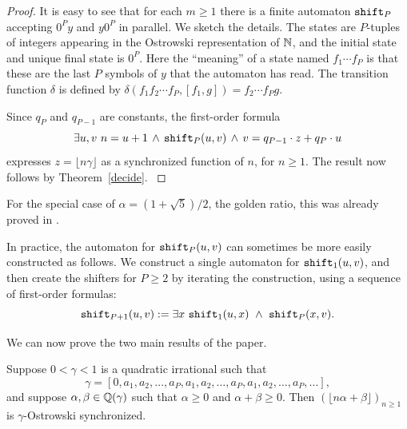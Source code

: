 \documentclass[12pt,reqno]{article}
\begin{document}
\begin{proof}
It is easy to see that for each
$m \geq 1$ there is a finite automaton
${\tt shift}_P$ accepting $0^P y$ and $y 0^P$ in parallel. 
We sketch the details.   The states are $P$-tuples of
integers appearing in the Ostrowski representation of 
$\mathbb{N}$, and the initial state and unique final state is $0^P$.
Here the ``meaning'' of a state named $f_1\cdots f_P$ is
that these are the last $P$ symbols of $y$ that the automaton has read.
The transition function $\delta$ is
defined by $\delta(f_1 f_2 \cdots f_P, [f_1, g]) = f_2 \cdots f_P g$.

Since $q_P$ and $q_{P-1}$ are constants, the 
first-order formula
$$\exists u,v \ n=u+1 \, \wedge \, {\tt shift}_P(u,v) \, \wedge \, v=q_{P-1} \cdot z + q_{P}
\cdot u$$
expresses $z = \lfloor n \gamma \rfloor$ as a synchronized function of $n$, for $n \geq 1$.  The result now follows by Theorem~\ref{decide}.
\label{main2}
\end{proof}

\begin{remark} 
For the special case of $\alpha = (1+\sqrt{5})/2$, the golden ratio, this was
already proved in \cite{Mousavi&Schaeffer&Shallit:2016}.   
\end{remark}

\begin{remark}
In practice, the automaton for ${\tt shift}_P(u,v)$ can sometimes be more
easily constructed as follows.  We construct a single automaton
for ${\tt shift}_1(u,v)$, and then create the shifters for $P \geq 2$
by iterating the construction, using a sequence of first-order formulas:
$$\shift_{P+1}(u,v) := \exists x \ \shift_1(u,x) \AND \shift_P(x,v).$$
\end{remark}

We can now prove the two main results of the paper.

\begin{theorem}
Suppose $0 < \gamma < 1$ is a quadratic irrational
such that 
$$\gamma = [0, a_1, a_2, \ldots, a_P, a_1, a_2, \ldots, a_P, a_1, a_2, \ldots, a_P,
\ldots],$$
and suppose $\alpha, \beta \in \mathbb{Q}(\gamma)$
such that $\alpha \geq 0$ and $\alpha+\beta \geq 0$.
Then $(\lfloor n \alpha + \beta \rfloor)_{n \geq 1}$
is $\gamma$-Ostrowski synchronized.
\label{main1}
\end{theorem}
\end{document}
